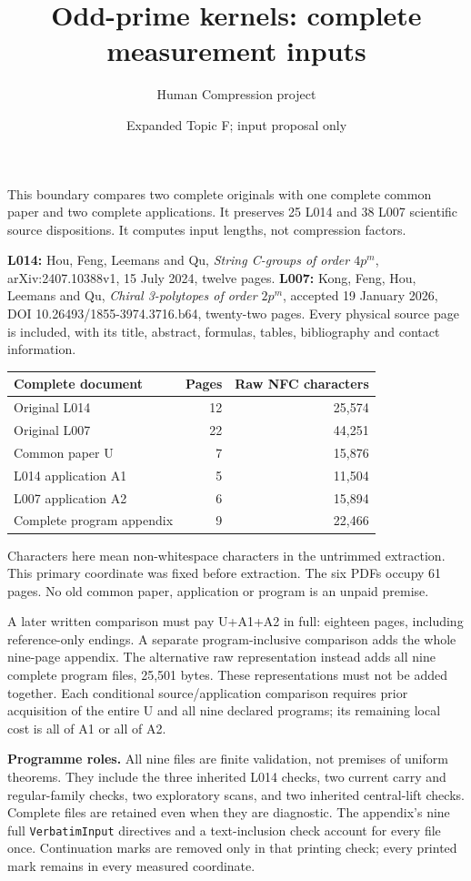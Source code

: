 \documentclass[a4paper,11pt]{article}
\title{Odd-prime kernels: complete measurement inputs}
\author{Human Compression project}\date{Expanded Topic F; input proposal only}
\begin{document}
\maketitle\raggedright
This boundary compares two complete originals with one complete common paper
and two complete applications. It preserves 25 L014 and 38 L007 scientific
source dispositions. It computes input lengths, not compression factors.

\textbf{L014:} Hou, Feng, Leemans and Qu, \emph{String C-groups of order
$4p^m$}, arXiv:2407.10388v1, 15 July 2024, twelve pages.
\textbf{L007:} Kong, Feng, Hou, Leemans and Qu, \emph{Chiral 3-polytopes of
order $2p^m$}, accepted 19 January 2026, DOI 10.26493/1855-3974.3716.b64,
twenty-two pages. Every physical source page is included, with its title,
abstract, formulas, tables, bibliography and contact information.

\begin{center}\begin{tabular}{@{}lrr@{}}\toprule
Complete document & Pages & Raw NFC characters\\\midrule
Original L014 &12&25,574\\Original L007 &22&44,251\\
Common paper U &7&15,876\\L014 application A1 &5&11,504\\
L007 application A2 &6&15,894\\Complete program appendix &9&22,466\\\bottomrule
\end{tabular}\end{center}
Characters here mean non-whitespace characters in the untrimmed extraction.
This primary coordinate was fixed before extraction. The six PDFs occupy 61
pages. No old common paper, application or program is an unpaid premise.

A later written comparison must pay U+A1+A2 in full: eighteen pages, including
reference-only endings. A separate program-inclusive comparison adds the
whole nine-page appendix. The alternative raw representation instead adds all
nine complete program files, 25,501 bytes. These representations
must not be added together. Each conditional source/application comparison
requires prior acquisition of the entire U and all nine declared programs;
its remaining local cost is all of A1 or all of A2.

\textbf{Programme roles.} All nine files are finite validation, not premises
of uniform theorems. They include the three inherited L014 checks, two current
carry and regular-family checks, two exploratory scans, and two inherited
central-lift checks. Complete files are retained even when they are diagnostic.
The appendix's nine full \texttt{VerbatimInput} directives and a text-inclusion
check account for every file once. Continuation marks are removed only in that
printing check; every printed mark remains in every measured coordinate.
\end{document}
